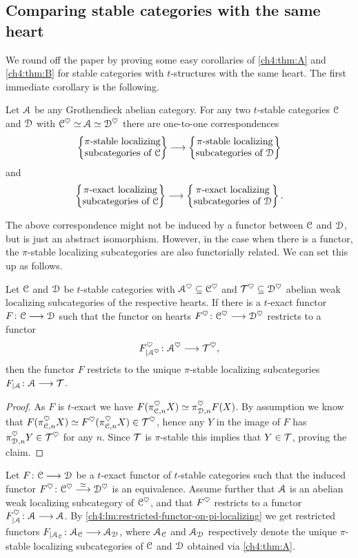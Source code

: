 \subsection{Comparing stable categories with the same heart}

We round off the paper by proving some easy corollaries of \cref{ch4:thm:A} and \cref{ch4:thm:B} for stable categories with $t$-structures with the same heart. The first immediate corollary is the following. 

\begin{corollary}
    Let $\A$ be any Grothendieck abelian category. For any two $t$-stable categories $\C$ and $\D$ with $\C^\heart \simeq \A\simeq \D^\heart$ there are one-to-one correspondences
    \[\pistable\to\pistableD\]
    and 
    \[\piexact\to \piexactD.\]
\end{corollary}

The above correspondence might not be induced by a functor between $\C$ and $\D$, but is just an abstract isomorphism. However, in the case when there is a functor, the $\pi$-stable localizing subcategories are also functorially related. We can set this up as follows. 

\begin{lemma}
    \label{ch4:lm:restricted-functor-on-pi-localizing}
    Let $\C$ and $\D$ be $t$-stable categories with $\A^\heart\subseteq \C^\heart$ and $\T^\heart\subseteq \D^\heart$ abelian weak localizing subcategories of the respective hearts. 
    If there is a $t$-exact functor $F\:\C\to \D$ such that the functor on hearts $F^\heart\: \C^\heart\to \D^\heart$ restricts to a functor 
    \[F^\heart_{\vert \A^\heart}\: \A^\heart \to \T^\heart,\]
    then the functor $F$ restricts to the unique $\pi$-stable localizing subcategories $F_{\vert \A}\:\A\to \T$. 
\end{lemma}
\begin{proof}
    As $F$ is $t$-exact we have $F(\pi_{\C,n}^\heart X)\simeq \pi_{\D, n}^\heart F(X)$. By assumption we know that $F(\pi_{\C,n}^{\heart}X) \simeq F^\heart(\pi_{\C,n}^\heart X) \in \T^\heart$, hence any $Y$ in the image of $F$ has $\pi_{\D,n}^\heart Y \in \T^\heart$ for any $n$. Since $\T$ is $\pi$-stable this implies that $Y\in \T$, proving the claim.
\end{proof}

Let $F\:\C\to\D$ be a $t$-exact functor of $t$-stable categories such that the induced functor $F^\heart \: \C^\heart\overset{\simeq}\to \D^\heart$ is an equivalence. Assume further that $\A$ is an abelian weak localizing subcategory of $\C^\heart$, and that $F^\heart$ restricts to a functor $F^\heart_{\vert \A}\:\A\to\A$. By \cref{ch4:lm:restricted-functor-on-pi-localizing} we get restricted functors $F_{\vert \A_\C}\: \A_\C \to \A_\D$, where $\A_\C$ and $\A_\D$ respectively denote the unique $\pi$-stable localizing subcategories of $\C$ and $\D$ obtained via \cref{ch4:thm:A}.

